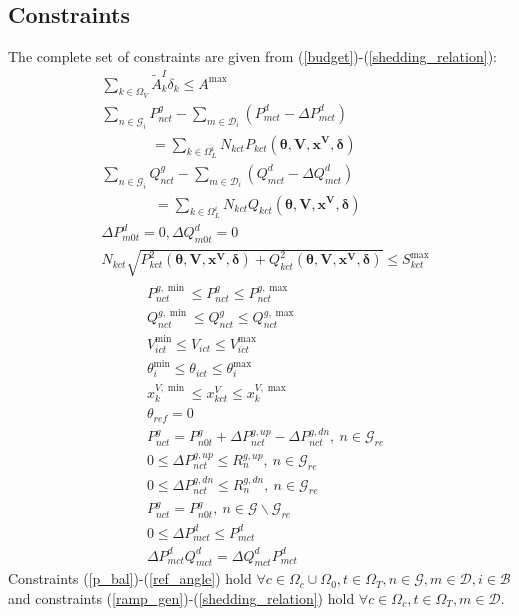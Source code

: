 \documentclass[journal]{IEEEtran}
\begin{document}
\subsection{Constraints}
The complete set of constraints are given from (\ref{budget})-(\ref{shedding_relation}):
\begin{align}
& \sum_{k \in \Omega_V} \tilde{A}_k^I\delta_k \le A^{\max} \label{budget} \\
&\sum_{n \in \mathcal{G}_i}P^g_{nct}-\sum_{m \in \mathcal{D}_i}(P^d_{mct}-\Delta P^d_{mct}) \nonumber \\
&\ \ \ \ \ \ \ \ \ \ \ \ \ \ \ \ =\sum_{k\in \Omega_{L}^{i}}  N_{kct}P_{kct}(\bm{\theta,V,x^V,\delta}) \label{p_bal}  \\
&\sum_{n \in \mathcal{G}_i}Q^g_{nct}-\sum_{m \in \mathcal{D}_i}(Q^d_{mct}-\Delta Q^d_{mct})  \nonumber \\
&\ \ \ \ \ \ \ \ \ \ \ \ \ \ \ \ \ =\sum_{k\in \Omega_{L}^{i}}  N_{kct}Q_{kct}(\bm{\theta,V,x^V,\delta}) \label{q_bal}  \\
&\Delta P^d_{m0t}=0, \Delta Q^d_{m0t}=0  \label{lS_normal} \\
&N_{kct}\sqrt{P^2_{kct}(\bm{\theta,V,x^V,\delta})+Q^2_{kct}(\bm{\theta,V,x^V,\delta})} \le S_{kct}^{\max} \label{thermal_limit} 
\end{align}
\begin{align}
& P_{nct}^{g,\min}\le P_{nct}^g \le P_{nct}^{g,\max} \label{Pg_limit1} \\
& Q_{nct}^{g,\min}\le Q_{nct}^g \le Q_{nct}^{g,\max} \label{Qg_limit1} \\
& V_{ict}^{\min} \le V_{ict} \le V_{ict}^{\max}  \label{v_limit}   \\
& \theta_{i}^{\min} \le \theta_{ict} \le \theta_{i}^{\max}  \label{theta_limit}  \\
& x_{k}^{V,\min} \le  x_{kct}^V \le  x_{k}^{V,\max}   \label{vsr_limit} \\ 
& \theta_{ref}=0   \label{ref_angle}   \\
&P_{nct}^g=P_{n0t}^g+\Delta P_{nct}^{g,up}-\Delta P_{nct}^{g,dn}, \ n\in \mathcal{G}_{re}    \label{ramp_gen}  \\
&0 \le \Delta P_{nct}^{g,up} \le R_n^{g,up}, \ n\in \mathcal{G}_{re}   \label{ramp_up}   \\
&0 \le \Delta P_{nct}^{g,dn}  \le R_n^{g,dn},\ n\in \mathcal{G}_{re}  \label{ramp_dn} \\
&P_{nct}^g=P_{n0t}^g, \ n\in \mathcal{G}\backslash\mathcal{G}_{re}  \label{g_fix}  \\
&0 \le \Delta P^d_{mct} \le P^d_{mct} \label{load_shedding}  \\
& \Delta P^d_{mct}Q^d_{mct}=\Delta Q^d_{mct}P^d_{mct}  \label{shedding_relation}
\end{align}
Constraints (\ref{p_bal})-(\ref{ref_angle}) hold $\forall c \in \Omega_c\cup \Omega_0, t \in \Omega_T, n \in \mathcal{G}, m \in \mathcal{D}, i\in \mathcal{B}$ and constraints (\ref{ramp_gen})-(\ref{shedding_relation}) hold $\forall c \in \Omega_c, t \in \Omega_T, m\in \mathcal{D}$.
\end{document}
